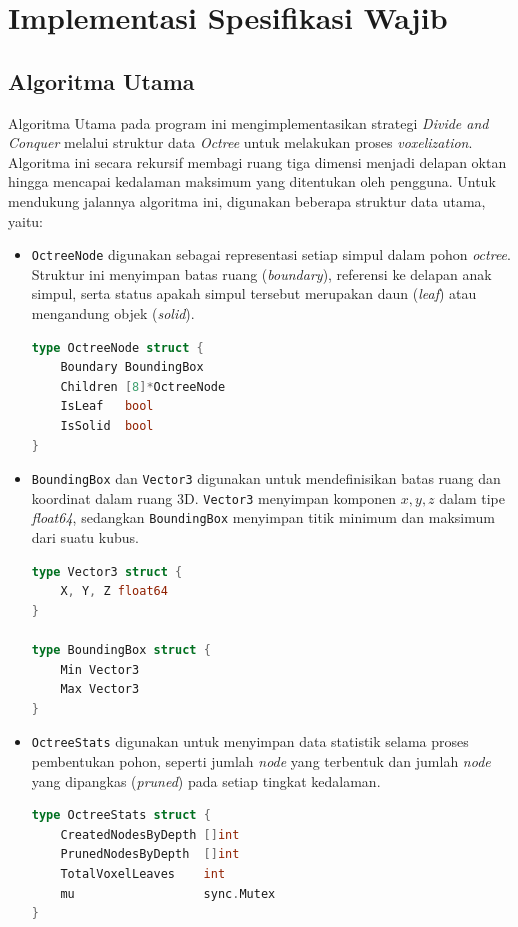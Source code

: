 \section{Implementasi Spesifikasi Wajib}\label{sec:Implementasi
Spesifikasi Wajib} %
\subsection{Algoritma Utama}\label{sub:Algoritma Utama} %

Algoritma Utama pada program ini mengimplementasikan strategi \textit{Divide and Conquer} melalui struktur data \textit{Octree} untuk melakukan proses \textit{voxelization}. Algoritma ini secara rekursif membagi ruang tiga dimensi menjadi delapan oktan hingga mencapai kedalaman maksimum yang ditentukan oleh pengguna. Untuk mendukung jalannya algoritma ini, digunakan beberapa struktur data utama, yaitu:

\begin{itemize}
    \item \texttt{OctreeNode} digunakan sebagai representasi setiap simpul dalam pohon \textit{octree}. Struktur ini menyimpan batas ruang (\textit{boundary}), referensi ke delapan anak simpul, serta status apakah simpul tersebut merupakan daun (\textit{leaf}) atau mengandung objek (\textit{solid}).
\begin{lstlisting}[language=Go, basicstyle=\ttfamily\small, breaklines=true]
type OctreeNode struct {
    Boundary BoundingBox
    Children [8]*OctreeNode
    IsLeaf   bool
    IsSolid  bool
}
\end{lstlisting}

    \item \texttt{BoundingBox} dan \texttt{Vector3} digunakan untuk mendefinisikan batas ruang dan koordinat dalam ruang 3D. \texttt{Vector3} menyimpan komponen $x, y, z$ dalam tipe \textit{float64}, sedangkan \texttt{BoundingBox} menyimpan titik minimum dan maksimum dari suatu kubus.
\begin{lstlisting}[language=Go, basicstyle=\ttfamily\small, breaklines=true]
type Vector3 struct {
    X, Y, Z float64
}

type BoundingBox struct {
    Min Vector3
    Max Vector3
}
\end{lstlisting}

    \item \texttt{OctreeStats} digunakan untuk menyimpan data statistik selama proses pembentukan pohon, seperti jumlah \textit{node} yang terbentuk dan jumlah \textit{node} yang dipangkas (\textit{pruned}) pada setiap tingkat kedalaman.
\begin{lstlisting}[language=Go, basicstyle=\ttfamily\small, breaklines=true]
type OctreeStats struct {
    CreatedNodesByDepth []int
    PrunedNodesByDepth  []int
    TotalVoxelLeaves    int
    mu                  sync.Mutex
}
\end{lstlisting}
\end{itemize}

